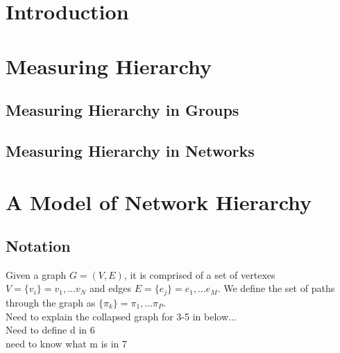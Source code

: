 \documentclass[3p,times]{elsarticle}
\begin{document}
\section{Introduction}
\label{sec:introduction}

\section{Measuring Hierarchy}

\subsection{Measuring Hierarchy in Groups}


\subsection{Measuring Hierarchy in Networks}


\section{A Model of Network Hierarchy}

\subsection{Notation}
Given a graph $G=(V,E)$, it is comprised of a set of vertexes $V=\{v_i\}={v_1,...v_N}$ and edges $E=\{e_j\}=e_1,...e_M$. We define the set of paths through the graph as $\{\pi_{k}\}=\pi_1,...\pi_P$. \\ Need to explain the collapsed graph for 3-5 in below...\\Need to define d in 6 \\need to know what m is in 7 \\
\end{document}
